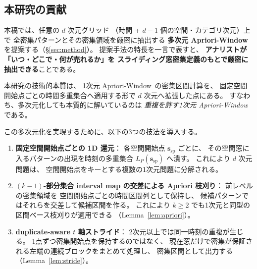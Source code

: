 \subsection{本研究の貢献}

本稿では、任意の $d$ 次元グリッド
（時間 + $d{-}1$ 個の空間・カテゴリ次元）上で
全密集パターンとその密集領域を厳密に抽出する
\textbf{多次元 Apriori-Window}を提案する（\S\ref{sec:method}）。
提案手法の特長を一言で表すと、
\textbf{アナリストが「いつ・どこで・何が売れるか」を
スライディング窓密集定義のもとで厳密に抽出できる}ことである。

本研究の技術的本質は、
1次元 Apriori-Window~\cite{aprioriwindow}の密集区間計算を、
固定空間開始点ごとの時間多重集合へ適用する形で
$d$ 次元へ拡張した点にある。
すなわち、多次元化しても本質的に解いているのは
\emph{重複を許す1次元 Apriori-Window} である。

この多次元化を実現するために、以下の3つの技法を導入する。

\begin{enumerate}
\item \textbf{固定空間開始点ごとの 1D 還元}：
各空間開始点 $\bm{s}_{\mathrm{sp}}$ ごとに、
その空間窓に入るパターンの出現を時刻の多重集合
$L_P(\bm{s}_{\mathrm{sp}})$ へ潰す。
これにより $d$ 次元問題は、
空間開始点をキーとする複数の1次元問題に分解される。

\item \textbf{$(k{-}1)$-部分集合 interval map の交差による Apriori 枝刈り}：
前レベルの密集領域を
空間開始点ごとの時間区間列として保持し、
候補パターンではそれらを交差して候補区間を作る。
これにより $k \geq 2$ でも1次元と同型の区間ベース枝刈りが適用できる
（Lemma~\ref{lem:apriori}）。

\item \textbf{duplicate-aware $t$ 軸ストライド}：
2次元以上では同一時刻の重複が生じる。
1点ずつ密集開始点を保持するのではなく、
現在窓だけで密集が保証される左端の連続ブロックをまとめて処理し、
密集区間として出力する（Lemma~\ref{lem:stride}）。
\end{enumerate}
